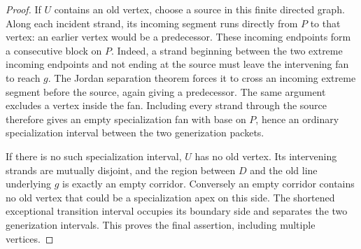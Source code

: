 \begin{proof}
If $U$ contains an old vertex, choose a source in this finite directed
graph. Along each incident strand, its incoming segment runs directly
from $P$ to that vertex: an earlier vertex would be a predecessor.
These incoming endpoints form a consecutive block on $P$. Indeed, a
strand beginning between the two extreme incoming endpoints and not
ending at the source must leave the intervening fan to reach $g$.
The Jordan separation theorem forces it to cross an incoming extreme
segment before the source, again giving a predecessor. The same
argument excludes a vertex inside the fan. Including every strand
through the source therefore gives an empty specialization fan with
base on $P$, hence an ordinary specialization interval between the
two generization packets.

If there is no such specialization interval, $U$ has no old vertex.
Its intervening strands are mutually disjoint, and the region between
$D$ and the old line underlying $g$ is exactly an empty corridor.
Conversely an empty corridor contains no old vertex that could be a
specialization apex on this side. The shortened exceptional transition
interval occupies its boundary side and separates the two generization
intervals. This proves the final assertion, including multiple vertices.
\end{proof}

